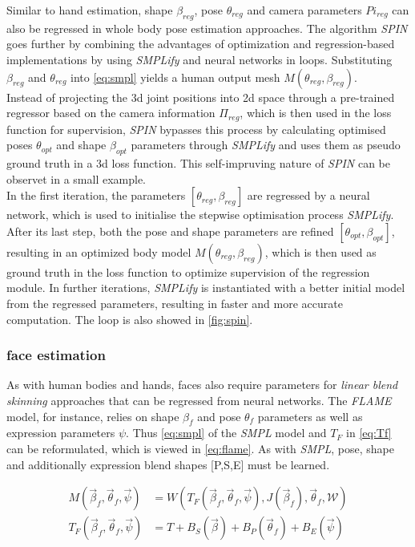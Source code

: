 Similar to hand estimation, shape $\beta_{reg}$, pose $\theta_{reg}$ and camera parameters $Pi_{reg}$ can also be regressed in whole body pose estimation approaches. The algorithm \emph{SPIN} \cite{spin} goes further by combining the advantages of optimization and regression-based implementations by using \emph{SMPLify} and neural networks in loops. Substituting $\beta_{reg}$ and $\theta_{reg}$ into \autoref{eq:smpl} yields a human output mesh $M(\theta_{reg},\beta_{reg})$. \\ 
Instead of projecting the 3d joint positions into 2d space through a pre-trained regressor based on the camera information $\Pi_{reg}$, which is then used in the loss function for supervision, \emph{SPIN} bypasses this process by calculating optimised poses $\theta_{opt}$ and shape $\beta_{opt}$ parameters through \emph{SMPLify} and uses them as pseudo ground truth in a 3d loss function. This self-impruving nature of \emph{SPIN} can be observet in a small example. \\
In the first iteration, the parameters $[\theta_{reg},\beta_{reg}]$ are regressed by a neural network, which is used to initialise the stepwise optimisation process \emph{SMPLify}. After its last step, both the pose and shape parameters are refined $[\theta_{opt},\beta_{opt}]$, resulting in an optimized body model $M(\theta_{reg},\beta_{reg})$, which is then used as ground truth in the loss function to optimize supervision of the regression module. In further iterations, \emph{SMPLify} is instantiated with a better initial model from the regressed parameters, resulting in faster and more accurate computation. The loop is also showed in \autoref{fig:spin}. 

\subsubsection{face estimation}
As with human bodies and hands, faces also require parameters for \emph{linear blend skinning} approaches that can be regressed from neural networks. The \emph{FLAME} model, for instance, relies on shape $\beta_{f}$ and pose $\theta_{f}$ parameters as well as expression parameters  $\psi$. Thus \autoref{eq:smpl} of the \emph{SMPL} model and $T_{F}$ in \autoref{eq:Tf} can be reformulated, which is viewed in \autoref{eq:flame}. As with \emph{SMPL}, pose, shape and additionally expression blend shapes [P,S,E] must be learned. \cite{flame}

\begin{equation}
\label{eq:flame}
\begin{split}
M(\vec{\beta}_{f},\vec{\theta}_{f}, \vec{\psi}) &= W(T_{F}(\vec{\beta}_{f},\vec{\theta}_{f}, \vec{\psi}),J(\vec{\beta}_{f}),\vec{\theta}_{f},\mathcal{W}) \\
T_{F}(\vec{\beta}_{f},\vec{\theta}_{f}, \vec{\psi}) &= T + B_{S}(\vec{\beta}) + B_{P}(\vec{\theta}_{f}) + B_{E} (\vec{\psi})
\end{split}
\end{equation}

